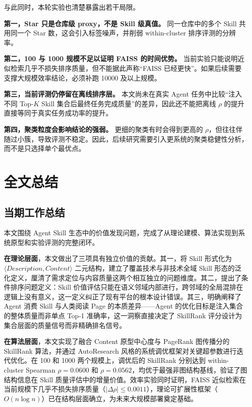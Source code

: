 与此同时，本轮实验也清楚暴露出若干局限。

\textbf{第一，Star 只是仓库级 proxy，不是 Skill 级真值。} 同一仓库中的多个 Skill 共用同一个 Star 数，这会引入标签噪声，并削弱 within-cluster 排序评测的分辨率。

\textbf{第二，100 与 1000 规模不足以证明 FAISS 的时间优势。} 当前实验只能说明近似检索几乎不损失排序质量，但不能据此声称“FAISS 已经更快”。如果后续需要支撑大规模效率结论，必须补跑 10000 及以上规模。

\textbf{第三，当前评测仍停留在离线排序层。} 本文尚未在真实 Agent 任务中比较“注入不同 Top-$K$ Skill 集合后最终任务完成质量”的差异，因此还不能把离线 $\rho$ 的提升直接等同于真实任务成功率的提升。

\textbf{第四，聚类粒度会影响结论的强弱。} 更细的聚类有时会得到更高的 $\rho$，但往往伴随过小簇，导致评测不稳定。因此，后续研究需要引入更系统的聚类稳健性分析，而不是只选择单个最优点。

\section{全文总结}
\label{sec:conclusion}

\subsection{当期工作总结}

本文围绕 Agent Skill 生态中的价值发现问题，完成了从理论建模、算法实现到系统原型和实验评测的完整闭环。

\textbf{在理论层面}，本文做出了三项具有独立价值的贡献。其一，将 Skill 形式化为 $\langle Description, Content \rangle$ 二元结构，建立了覆盖技术与非技术全域 Skill 形态的泛化定义，厘清了需求定位与内容质量这两个相互独立的问题维度。其二，提出了条件排序问题定义：Skill 价值评估只能在语义邻域内部进行，跨邻域的全局混排在逻辑上没有意义，这一定义纠正了现有平台的根本设计错误。其三，明确阐释了 Agent 消费 Skill 与人类阅读 Page 的本质差异——Agent 的优化目标是注入集合的整体质量而非单点 Top-1 准确率，这一洞察直接决定了 SkillRank 评分设计为集合层面的质量信号而非精确排名信号。

\textbf{在算法层面}，本文实现了融合 Content 原型中心度与 PageRank 图传播分的 SkillRank 算法，并通过 AutoResearch 风格的系统调优框架对关键超参数进行迭代优化。在 100 和 1000 两个规模上，调优后的 SkillRank 分别达到 within-cluster Spearman $\rho = 0.0600$ 和 $\rho = 0.0562$，均优于最强非图结构基线，验证了图结构信息在 Skill 质量评估中的增量价值。效率实验同时证明，FAISS 近似检索在当前规模下几乎不损失排序质量（$|\Delta\rho| \leq 0.0011$），理论可扩展性框架（$O(n\log n)$）已在结构层面确立，为未来大规模部署奠定基础。

